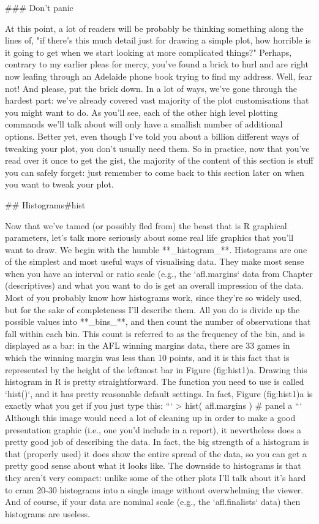 ### Don't panic

At this point, a lot of readers will be probably be thinking something along the lines of, "if there's this much detail just for drawing a simple plot, how horrible is it going to get when we start looking at more complicated things?" Perhaps, contrary to my earlier pleas for mercy, you've found a brick to hurl and are right now leafing through an Adelaide phone book trying to find my address. Well, fear not! And please, put the brick down. In a lot of ways, we've gone through the hardest part: we've already covered vast majority of the plot customisations that you might want to do. As you'll see, each of the other high level plotting commands we'll talk about will only have a smallish number of additional options. Better yet, even though I've told you about a billion different ways of tweaking your plot, you don't usually need them. So in practice, now that you've read over it once to get the gist, the majority of the content of this section is stuff you can safely forget: just remember to come back to this section later on when you want to tweak your plot. 

## Histograms{#hist}
 
Now that we've tamed (or possibly fled from) the beast that is R graphical parameters, let's talk more seriously about some real life graphics that you'll want to draw. We begin with the humble **_histogram_**. Histograms are one of the simplest and most useful ways of visualising data. They make most sense when you have an interval or ratio scale (e.g., the `afl.margins` data from Chapter \@ref(descriptives) and what you want to do is get an overall impression of the data. Most of you probably know how histograms work, since they're so widely used, but for the sake of completeness I'll describe them. All you do is divide up the possible values into **_bins_**, and then count the number of observations that fall within each bin. This count is referred to as the frequency of the bin, and is displayed as a bar: in the AFL winning margins data, there are 33 games in which the winning margin was less than 10 points, and it is this fact that is represented by the height of the leftmost bar in Figure \@ref(fig:hist1)a. Drawing this histogram in R is pretty straightforward. The function you need to use is called `hist()`, and it has pretty reasonable default settings. In fact, Figure \@ref(fig:hist1)a is exactly what you get if you just type this:
```
> hist( afl.margins )   # panel a
```
Although this image would need a lot of cleaning up in order to make a good presentation graphic (i.e., one you'd include in a report), it nevertheless does a pretty good job of describing the data. In fact, the big strength of a histogram is that (properly used) it does show the entire spread of the data, so you can get a pretty good sense about what it looks like. The downside to histograms is that they aren't very compact: unlike some of the other plots I'll talk about it's hard to cram 20-30 histograms into a single image without overwhelming the viewer. And of course, if your data are nominal scale (e.g., the `afl.finalists` data) then histograms are useless.

